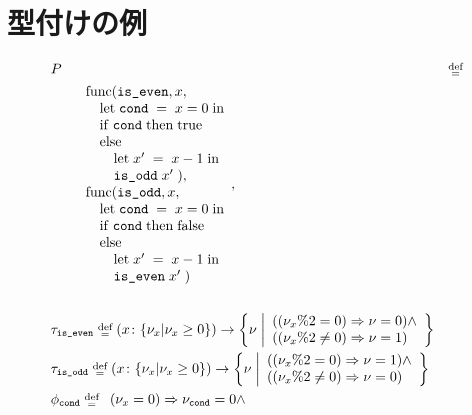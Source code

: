 \section{型付けの例}
\label{sec:typing:example}

\begin{align*}
  & P \; &\defeq& \; \\
  &\quad\quad \begin{array}{l}
    \Func
      {\code{is\_even}}{x}
      {\\ \quad \Let
        {\; \code{cond} \;}{\; x=0 \;}
        {\\ \quad \If{\; \code{cond} \;}{\; \true \\ \quad}
        {\\ \quad\quad \Let{\; x' \;}{\; x-1 \;}
        {\\ \quad\quad \App{\code{is\_odd}}{x'}}} \; }
      }, \\
    \Func
      {\code{is\_odd}}{x}
      {\\ \quad \Let
        {\; \code{cond} \;}{\; x = 0 \;}
        {\\ \quad \If{\; \code{cond} \;}{\; \false \\ \quad}
        {\\ \quad\quad \Let{\; x' \;}{\; x-1 \;}
        {\\ \quad\quad \App{\code{is\_even}}{x'}}} \;}
      } \\
  \end{array}, \\\\
  & \tau_\code{is\_even} \; \defeq \; \TyFunc{x}{\TyInt{\nu_x}{\nu_x \geq 0}}{\left\TyInt{\nu \; \middle}{\begin{array}{l}
            \paren{\paren{\nu_x \% 2 = 0} \Rightarrow \nu = 0} \land \\
            \paren{\paren{\nu_x \% 2 \neq 0} \Rightarrow \nu = 1}
  \end{array}\right}} \\
  & \tau_\code{is\_odd} \; \defeq \; \TyFunc{x}{\TyInt{\nu_x}{\nu_x \geq 0}}{\left\TyInt{\nu \; \middle}{\begin{array}{l}
            \paren{\paren{\nu_x \% 2 = 0} \Rightarrow \nu = 1} \land \\
            \paren{\paren{\nu_x \% 2 \neq 0} \Rightarrow \nu = 0}
  \end{array}\right}} \\
  & \phi_\code{cond} \; \defeq \; \begin{array}{l}
            \paren{\nu_x = 0} \Rightarrow \nu_\code{cond} = 0 \land \\

\end{array}
\end{align*}
